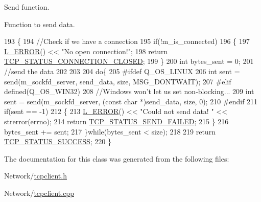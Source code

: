 Send function. 

Function to send data. 
\begin{DoxyCode}
193 \{
194     \textcolor{comment}{//Check if we have a connection}
195     \textcolor{keywordflow}{if}(!m\_is\_connected)
196     \{
197         \hyperlink{Log_8h_a1a242c34c5066fb0c62d909f22d3716d}{L\_ERROR}() << \textcolor{stringliteral}{"No open connection!"};
198         \textcolor{keywordflow}{return} \hyperlink{tcpclient_8h_ab36b81f0daebbad95a533ea9951ee569a31579e5845f194f359afdb50b2f85a86}{TCP\_STATUS\_CONNECTION\_CLOSED};
199     \}
200     \textcolor{keywordtype}{int} bytes\_sent = 0;
201     \textcolor{comment}{//send the data}
202 
203 
204     \textcolor{keywordflow}{do}\{
205 \textcolor{preprocessor}{#ifdef Q\_OS\_LINUX}
206 \textcolor{preprocessor}{}        \textcolor{keywordtype}{int} sent = send(m\_sockfd\_server, send\_data, size, MSG\_DONTWAIT);
207 \textcolor{preprocessor}{#elif defined(Q\_OS\_WIN32)}
208 \textcolor{preprocessor}{}        \textcolor{comment}{//Windows won't let us set non-blocking...}
209         \textcolor{keywordtype}{int} sent = send(m\_sockfd\_server, (\textcolor{keyword}{const} \textcolor{keywordtype}{char} *)send\_data, size, 0);
210 \textcolor{preprocessor}{#endif}
211 \textcolor{preprocessor}{}        \textcolor{keywordflow}{if}(sent == -1)
212         \{
213             \hyperlink{Log_8h_a1a242c34c5066fb0c62d909f22d3716d}{L\_ERROR}() << \textcolor{stringliteral}{"Could not send data! "} << strerror(errno);
214             \textcolor{keywordflow}{return} \hyperlink{tcpclient_8h_ab36b81f0daebbad95a533ea9951ee569a0fbe81dbe6a6972d6c80cecad3ee0d73}{TCP\_STATUS\_SEND\_FAILED};
215         \}
216         bytes\_sent += sent;
217     \}\textcolor{keywordflow}{while}(bytes\_sent < size);
218 
219     \textcolor{keywordflow}{return} \hyperlink{tcpclient_8h_ab36b81f0daebbad95a533ea9951ee569a12de2815c3e64df634ac4d26a0bb2007}{TCP\_STATUS\_SUCCESS};
220 \}
\end{DoxyCode}


The documentation for this class was generated from the following files\-:\begin{DoxyCompactItemize}
\item 
Network/\hyperlink{tcpclient_8h}{tcpclient.\-h}\item 
Network/\hyperlink{tcpclient_8cpp}{tcpclient.\-cpp}\end{DoxyCompactItemize}
